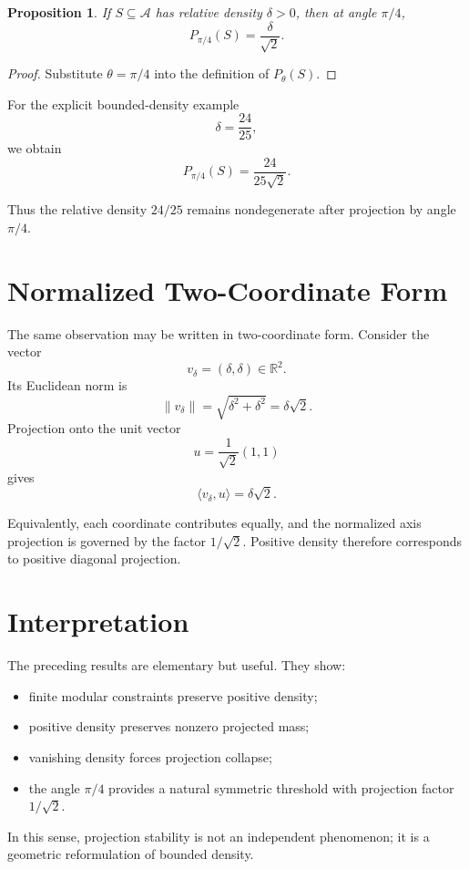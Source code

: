 \documentclass[11pt]{article}
\theoremstyle{plain}
\newtheorem{proposition}{Proposition}
\theoremstyle{definition}
\begin{document}
\begin{proposition}
If $S \subseteq \mathcal{A}$ has relative density $\delta>0$, then at angle $\pi/4$,
\[
P_{\pi/4}(S)=\frac{\delta}{\sqrt{2}}.
\]
\end{proposition}

\begin{proof}
Substitute $\theta=\pi/4$ into the definition of $P_\theta(S)$.
\end{proof}

For the explicit bounded-density example
\[
\delta=\frac{24}{25},
\]
we obtain
\[
P_{\pi/4}(S)=\frac{24}{25\sqrt{2}}.
\]

Thus the relative density $24/25$ remains nondegenerate after projection by angle $\pi/4$.

\section{Normalized Two-Coordinate Form}

The same observation may be written in two-coordinate form. Consider the vector
\[
v_\delta = (\delta,\delta)\in\mathbb{R}^2.
\]
Its Euclidean norm is
\[
\|v_\delta\| = \sqrt{\delta^2+\delta^2} = \delta\sqrt{2}.
\]
Projection onto the unit vector
\[
u = \frac{1}{\sqrt{2}}(1,1)
\]
gives
\[
\langle v_\delta, u\rangle
=
\delta\sqrt{2}.
\]

Equivalently, each coordinate contributes equally, and the normalized axis projection is governed by the factor $1/\sqrt{2}$. Positive density therefore corresponds to positive diagonal projection.

\section{Interpretation}

The preceding results are elementary but useful. They show:

\begin{itemize}
    \item finite modular constraints preserve positive density;
    \item positive density preserves nonzero projected mass;
    \item vanishing density forces projection collapse;
    \item the angle $\pi/4$ provides a natural symmetric threshold with projection factor $1/\sqrt{2}$.
\end{itemize}

In this sense, projection stability is not an independent phenomenon; it is a geometric reformulation of bounded density.
\end{document}
